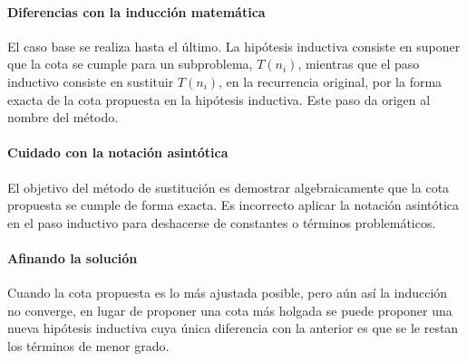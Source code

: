 \paragraph{Diferencias con la inducción matemática}
    El caso base se realiza hasta el último. La hipótesis inductiva consiste en suponer 
    que la cota se cumple para un subproblema, $T(n_{i})$, mientras que el paso inductivo 
    consiste en sustituir $T(n_{i})$, en la recurrencia original, por la forma exacta 
    de la cota propuesta en la hipótesis inductiva. Este paso da origen al nombre del método.
\paragraph{Cuidado con la notación asintótica} 
    El objetivo del método de sustitución es demostrar algebraicamente que 
    la cota propuesta se cumple de forma exacta. Es incorrecto aplicar la notación 
    asintótica en el paso inductivo para deshacerse de constantes o términos problemáticos.
\paragraph{Afinando la solución} 
    Cuando la cota propuesta es lo más ajustada posible, 
    pero aún así la inducción no converge, en lugar de proponer una cota más holgada
    se puede proponer una nueva hipótesis inductiva cuya única diferencia
    con la anterior es que se le restan los términos de menor grado.

